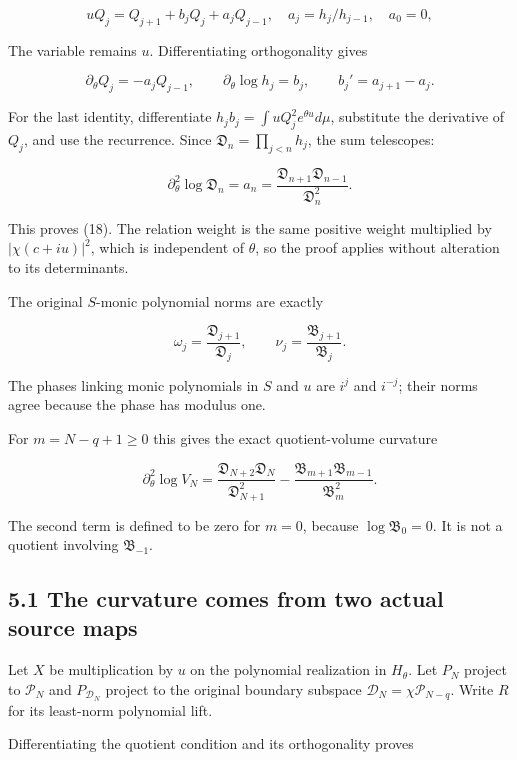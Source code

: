 \documentclass[
  11pt,
]{article}
\begin{document}
\[
u Q_j=Q_{j+1}+b_jQ_j+a_jQ_{j-1},\quad a_j=h_j/h_{j-1},\quad a_0=0,
\]

The variable remains \(u\). Differentiating orthogonality gives

\[
\partial_\theta Q_j=-a_jQ_{j-1},\qquad
\partial_\theta\log h_j=b_j,\qquad b_j'=a_{j+1}-a_j.
\]

For the last identity, differentiate
\(h_jb_j=\int uQ_j^2e^{\theta u}d\mu\), substitute the derivative of
\(Q_j\), and use the recurrence. Since \(\mathfrak D_n=\prod_{j<n}h_j\),
the sum telescopes:

\[
\partial_\theta^2\log\mathfrak D_n=a_n
=\frac{\mathfrak D_{n+1}\mathfrak D_{n-1}}{\mathfrak D_n^2}.
\]

This proves (18). The relation weight is the same positive weight
multiplied by \(|\chi(c+iu)|^2\), which is independent of \(\theta\), so
the proof applies without alteration to its determinants.

The original \(S\)-monic polynomial norms are exactly

\[
\omega_j=\frac{\mathfrak D_{j+1}}{\mathfrak D_j},\qquad
\nu_j=\frac{\mathfrak B_{j+1}}{\mathfrak B_j}.
\tag{19}
\]

The phases linking monic polynomials in \(S\) and \(u\) are \(i^j\) and
\(i^{-j}\); their norms agree because the phase has modulus one.

For \(m=N-q+1\ge0\) this gives the exact quotient-volume curvature

\[
\boxed{
\partial_\theta^2\log V_N
=\frac{\mathfrak D_{N+2}\mathfrak D_N}{\mathfrak D_{N+1}^2}
-\frac{\mathfrak B_{m+1}\mathfrak B_{m-1}}{\mathfrak B_m^2}.
}
\tag{20}
\]

The second term is defined to be zero for \(m=0\), because
\(\log\mathfrak B_0=0\). It is not a quotient involving
\(\mathfrak B_{-1}\).

\subsection{5.1 The curvature comes from two actual source
maps}\label{the-curvature-comes-from-two-actual-source-maps}

Let \(X\) be multiplication by \(u\) on the polynomial realization in
\(H_\theta\). Let \(P_N\) project to \(\mathcal P_N\) and
\(P_{\mathcal D_N}\) project to the original boundary subspace
\(\mathcal D_N=\chi\mathcal P_{N-q}\). Write \(R\) for its least-norm
polynomial lift.

Differentiating the quotient condition and its orthogonality proves
\end{document}
